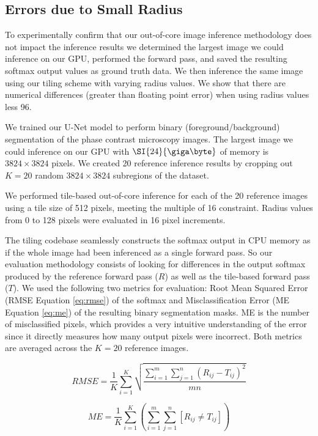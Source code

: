 \documentclass[letterpaper]{article} %
\begin{document}
\subsection{Errors due to Small Radius}

To experimentally confirm that our out-of-core image inference methodology does not impact the inference results we determined the largest image we could inference on our GPU, performed the forward pass, and saved the resulting softmax output values as ground truth data. We then inference the same image using our tiling scheme with varying radius values. We show that there are numerical differences (greater than floating point error) when using radius values less 96. 

We trained our U-Net model to perform binary (foreground/background) segmentation of the phase contrast microscopy images. The largest image we could inference on our GPU with $\SI{24}{\giga\byte}$ of memory is $3824 \times 3824$ pixels. We created 20 reference inference results by cropping out $K = 20$ random $3824 \times 3824$ subregions of the dataset. 

We performed tile-based out-of-core inference for each of the 20 reference images using a tile size of 512 pixels, meeting the multiple of 16 constraint. Radius values from 0 to 128 pixels were evaluated in 16 pixel increments. 

The tiling codebase seamlessly constructs the softmax output in CPU memory as if the whole image had been inferenced as a single forward pass. So our evaluation methodology consists of looking for differences in the output softmax produced by the reference forward pass ($R$) as well as the tile-based forward pass ($T$). We used the following two metrics for evaluation: Root Mean Squared Error (RMSE Equation \ref{eq:rmse}) of the softmax and Misclassification Error (ME Equation \ref{eq:me}) of the resulting binary segmentation masks. ME is the number of misclassified pixels, which provides a very intuitive understanding of the error since it directly measures how many output pixels were incorrect. Both metrics are averaged across the $K = 20$ reference images.

\begin{equation}
RMSE = \frac{1}{K} \sum_{i=1}^{K} \sqrt{ \frac{\sum_{i = 1}^{m} \sum_{j = 1}^{n} (R_{ij} - T_{ij})^2}{mn}}
\label{eq:rmse}
\end{equation}

\begin{equation}
ME = \frac{1}{K} \sum_{i=1}^{K} \left( \sum_{i = 1}^{m} \sum_{j = 1}^{n} [ R_{ij} \neq T_{ij} ] \right) 
\label{eq:me}
\end{equation}
\end{document}
